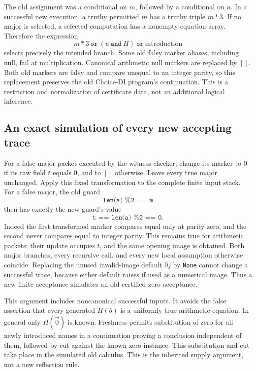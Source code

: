 \documentclass[11pt,letterpaper]{article}
\theoremstyle{definition}\newtheorem{definition}[theorem]{Definition}
\theoremstyle{remark}\newtheorem{remark}[theorem]{Remark}
\begin{document}
The old assignment was a conditional on $m$, followed by a conditional
on $u$. In a successful new execution, a truthy permitted $m$ has a
truthy triple $m*3$. If no major is selected, a selected computation
has a nonempty equation array. Therefore the expression
\[
  m*3\ \texttt{or}\ (u\ \texttt{and}\ H)\ \texttt{or}\ \text{introduction}
\]
selects precisely the intended branch. Some old falsy marker aliases,
including null, fail at multiplication. Canonical arithmetic null
markers are replaced by $[]$. Both old markers are falsy and compare
unequal to an integer parity, so this replacement preserves the old
Choice-DI program's continuation. This is a restriction and normalization
of certificate data, not an additional logical inference.

\subsection{An exact simulation of every new accepting trace}

For a false-major packet executed by the witness checker, change its
marker to $0$ if its raw field $t$ equals $0$, and to $[]$ otherwise.
Leave every true major unchanged. Apply this fixed transformation to
the complete finite input stack. For a false major, the old guard
\[
             \texttt{len(a) \% 2 == m}
\]
then has exactly the new guard's value
\[
             \texttt{t == len(a) \% 2 == 0}.
\]
Indeed the first transformed marker compares equal only at parity zero,
and the second never compares equal to integer parity. This remains
true for arithmetic packets: their update occupies $t$, and the same
opening image is obtained. Both major branches, every recursive call,
and every new local assumption otherwise coincide. Replacing the unused
invalid-image default $0j$ by \texttt{None} cannot change a successful
trace, because either default raises if used as a numerical image.
Thus a new finite acceptance simulates an old certified-zero acceptance.

This argument includes noncanonical successful inputs. It avoids the
false assertion that every generated $H(b)$ is a uniformly true arithmetic
equation. In general only $H(\vec0)$ is known. Freshness permits substitution
of zero for all newly introduced names in a continuation proving a
conclusion independent of them, followed by cut against the known zero
instance. This substitution and cut take place in the simulated old
calculus. This is the inherited supply argument, not a new reflection rule.
\end{document}
